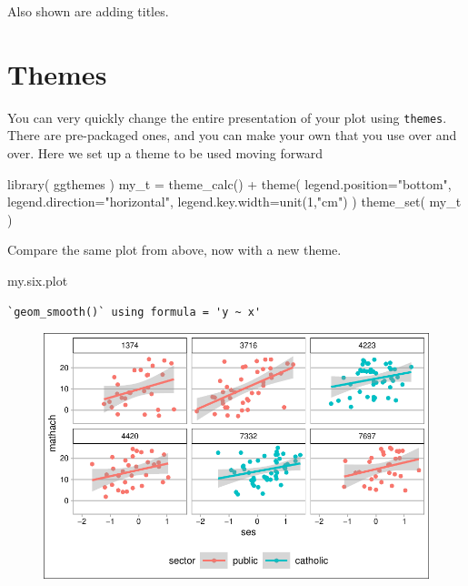 \documentclass[
  letterpaper,
  DIV=11,
  numbers=noendperiod]{scrreprt}
\newenvironment{Shaded}{\begin{snugshade}}{\end{snugshade}}
\newcommand{\AttributeTok}[1]{\textcolor[rgb]{0.49,0.56,0.16}{#1}}
\newcommand{\DecValTok}[1]{\textcolor[rgb]{0.25,0.63,0.44}{#1}}
\newcommand{\FunctionTok}[1]{\textcolor[rgb]{0.02,0.16,0.49}{#1}}
\newcommand{\NormalTok}[1]{\textcolor[rgb]{0.00,0.44,0.13}{#1}}
\newcommand{\OtherTok}[1]{\textcolor[rgb]{0.00,0.44,0.13}{#1}}
\newcommand{\SpecialCharTok}[1]{\textcolor[rgb]{0.25,0.44,0.63}{#1}}
\newcommand{\StringTok}[1]{\textcolor[rgb]{0.25,0.44,0.63}{#1}}
\begin{document}
Also shown are adding titles.

\hypertarget{themes}{%
\section{Themes}\label{themes}}

You can very quickly change the entire presentation of your plot using
\texttt{themes}. There are pre-packaged ones, and you can make your own
that you use over and over. Here we set up a theme to be used moving
forward

\begin{Shaded}
\begin{Highlighting}[]
\FunctionTok{library}\NormalTok{( ggthemes )}
\NormalTok{my\_t }\OtherTok{=} \FunctionTok{theme\_calc}\NormalTok{() }\SpecialCharTok{+} \FunctionTok{theme}\NormalTok{( }\AttributeTok{legend.position=}\StringTok{"bottom"}\NormalTok{, }
                             \AttributeTok{legend.direction=}\StringTok{"horizontal"}\NormalTok{, }
                             \AttributeTok{legend.key.width=}\FunctionTok{unit}\NormalTok{(}\DecValTok{1}\NormalTok{,}\StringTok{"cm"}\NormalTok{)  )}
\FunctionTok{theme\_set}\NormalTok{( my\_t )}
\end{Highlighting}
\end{Shaded}

Compare the same plot from above, now with a new theme.

\begin{Shaded}
\begin{Highlighting}[]
\NormalTok{my.six.plot}
\end{Highlighting}
\end{Shaded}

\begin{verbatim}
`geom_smooth()` using formula = 'y ~ x'
\end{verbatim}

\begin{figure}[H]

{\centering \includegraphics{intro_ggplot_files/figure-pdf/unnamed-chunk-10-1.pdf}

}

\end{figure}
\end{document}
